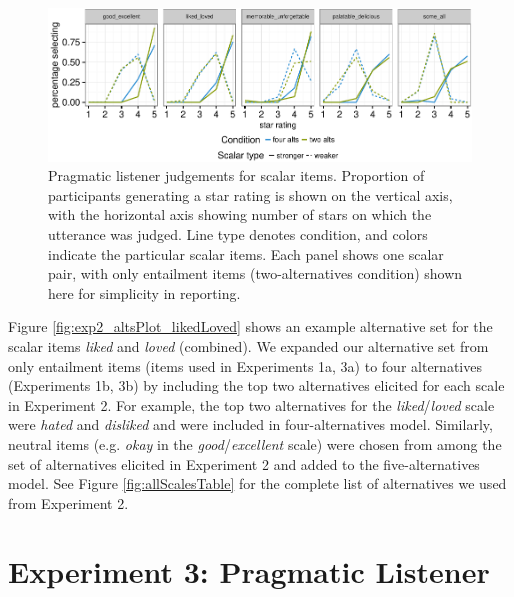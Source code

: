 \documentclass[10pt, letterpaper]{article}
\newenvironment{CodeChunk}{}{}
\begin{document}
\begin{CodeChunk}
\captionsetup{width=0.8\textwidth}\begin{figure}[t]

{\centering \includegraphics{figs/exp2Plots-1} 

}

\caption[Pragmatic listener judgements for scalar items]{Pragmatic listener judgements for scalar items. Proportion of participants generating a star rating is shown on the vertical axis, with the horizontal axis showing number of stars on which the utterance was judged. Line type denotes condition, and colors indicate the particular scalar items. Each panel shows one scalar pair, with only entailment items (two-alternatives condition) shown here for simplicity in reporting.}\label{fig:exp2Plots}
\end{figure}
\end{CodeChunk}

Figure \ref{fig:exp2_altsPlot_likedLoved} shows an example alternative
set for the scalar items \emph{liked} and \emph{loved} (combined). We
expanded our alternative set from only entailment items (items used in
Experiments 1a, 3a) to four alternatives (Experiments 1b, 3b) by
including the top two alternatives elicited for each scale in Experiment
2. For example, the top two alternatives for the
\emph{liked}/\emph{loved} scale were \emph{hated} and \emph{disliked}
and were included in four-alternatives model. Similarly, neutral items
(e.g. \emph{okay} in the \emph{good}/\emph{excellent} scale) were chosen
from among the set of alternatives elicited in Experiment 2 and added to
the five-alternatives model. See Figure \ref{fig:allScalesTable} for the
complete list of alternatives we used from Experiment 2.

\section{Experiment 3: Pragmatic
Listener}\label{experiment-3-pragmatic-listener}
\end{document}
